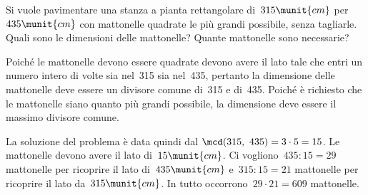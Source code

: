 \begin{esempio}{}{}
Si vuole pavimentare una stanza a pianta rettangolare di~\(315\munit{cm}\) 
per~\(435\munit{cm}\) con mattonelle quadrate le più grandi possibile, 
senza tagliarle. 
Quali sono le dimensioni delle  mattonelle? 
Quante mattonelle sono necessarie?

Poiché le mattonelle devono essere quadrate devono avere il lato tale che 
entri un numero intero di volte sia nel~315 sia nel~435, pertanto la 
dimensione delle mattonelle deve essere un divisore comune
di~315 e di~435. Poiché è richiesto che le mattonelle siano quanto più 
grandi possibile, la dimensione deve essere il massimo divisore comune.

\begin{center}
\hspace*{-11mm}
{\esematt}
\end{center}

{}

La soluzione del problema è data quindi dal 
\(\mcd(315,~435)=3 \cdot 5=15\). 
Le mattonelle devono avere il lato di~\(15\munit{cm}\).
Ci vogliono~\(435:15=29\) mattonelle per ricoprire il lato 
di~\(435\munit{cm}\) e~\(315:15=21\) mattonelle per ricoprire il lato
da~\(315\munit{cm}\). In tutto occorrono~\(29 \cdot 21 = 609\) mattonelle.
\end{esempio}


